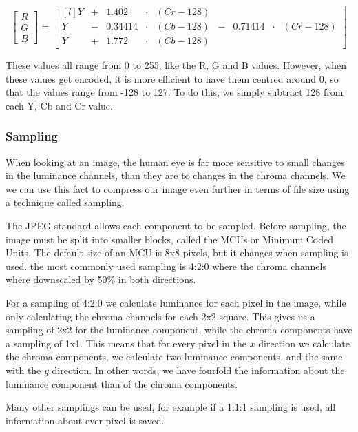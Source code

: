\begin{infobox}
$$\begin{bmatrix}
	R\\G\\B
\end{bmatrix} = \begin{bmatrix*}[l]
	Y&+&1.402 &\cdot & (Cr-128)&\\
	Y &-& 0.34414&\cdot &(Cb-128) &- &0.71414&\cdot&(Cr-128)\\
	Y &+& 1.772&\cdot& (Cb-128)&
\end{bmatrix*}$$

These values all range from 0 to 255, like the R, G and B values. 
However, when these values get encoded, it is more efficient to have them centred around 0, so that the values range from -128 to 127.
To do this, we simply subtract 128 from each Y, Cb and Cr value.

\vspace{4mm}
\subsubsection{Sampling}
\vspace{-2.5mm}
When looking at an image, the human eye is far more sensitive to small changes in the luminance channels, than they are to changes in the chroma channels. We we can use this fact to compress our image even further in terms of file size using a technique called sampling. 

The JPEG standard allows each component to be sampled.
Before sampling, the image must be split into smaller blocks, called the MCUs or Minimum Coded Units. The default size of an MCU is 8x8 pixels, but it changes when sampling is used. the most commonly used sampling is 4:2:0 where the chroma channels where downscaled by 50\% in both directions. 

For a sampling of 4:2:0 we calculate luminance for each pixel in the image, while only calculating the chroma channels for each 2x2 square.
This gives us a sampling of 2x2 for the luminance component, while the chroma components have a sampling of 1x1.
This means that for every pixel in the $x$ direction we calculate the chroma components, we calculate two luminance components, and the same with the $y$ direction.
In other words, we have fourfold the information about the luminance component than of the chroma components.

Many other samplings can be used, for example if a 1:1:1 sampling is used, all information about ever pixel is saved.


\end{infobox}

